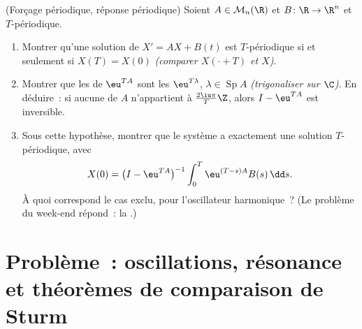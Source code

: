 \begin{exercise}[$\star\star\star$]\label{exo:b2:diffeq:12}
(Forçage périodique, réponse périodique) Soient $A \in
\mathcal{M}_n(\R)$ et $B \colon \R \to \R^n$  et
$T$-périodique.
\begin{enumerate}
  \item Montrer qu'une solution de $X' = AX + B(t)$ est
        $T$-périodique si et seulement si $X(T) = X(0)$
        \emph{(comparer $X(\cdot + T)$ et $X$)}.
  \item Montrer que les  de $\eu^{TA}$ sont les
        $\eu^{T\lambda}$, $\lambda \in \operatorname{Sp}A$
        \emph{(trigonaliser sur $\C$)}. En déduire~: si aucune
         de $A$ n'appartient à
        $\frac{2\iu\pi}{T}\Z$, alors $I - \eu^{TA}$ est
        inversible.
  \item Sous cette hypothèse, montrer que le système a
        exactement une solution $T$-périodique, avec
        \[
        X(0) = \bigl(I - \eu^{TA}\bigr)^{-1}
        \int_0^{T}\eu^{(T-s)A}B(s)\,\dd s .
        \]
        À quoi correspond le cas exclu, pour l'oscillateur
        harmonique~? (Le problème du week-end répond~: la
        .)
\end{enumerate}
\end{exercise}

\section{Problème~: oscillations, résonance et théorèmes de
comparaison de Sturm}

